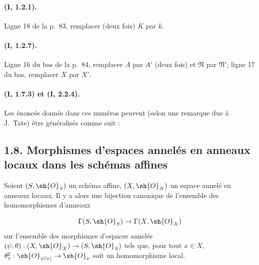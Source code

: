 \paragraph{(I, 1.2.1).}
Ligne 18 de la p.~83, remplacer (deux fois) $K$ par $k$.

\paragraph{(I, 1.2.7).}
Ligne 16 du bas de la p.~84, remplacer $A$ par $A'$ (deux fois) et
$\mathfrak N$ par $\mathfrak N'$; ligne 17 du bas, remplacer $X$ par
$X'$.

\paragraph{(I, 1.7.3) et (I, 2.2.4).}
Les énoncés donnés dans ces numéros peuvent (selon une remarque due à
J.~Tate) être généralisés comme suit :

\subsection*{1.8. Morphismes d'espaces annelés en anneaux locaux dans les schémas affines}
\label{ega2:addendum:subsection:I.1.8-fr}

\begin{proposition}[1.8.1]
\label{ega2:addendum:I.1.8.1-fr}
Soient $(S,\sh{O}_S)$ un schéma affine, $(X,\sh{O}_X)$ un espace annelé
en anneaux locaux. Il y a alors une bijection canonique de l'ensemble
des homomorphismes d'anneaux
\[
  \Gamma(S,\sh{O}_S)\to\Gamma(X,\sh{O}_X)
\]
sur l'ensemble des morphismes d'espaces annelés
$(\psi,\theta):(X,\sh{O}_X)\to(S,\sh{O}_S)$ tels que, pour tout
$x\in X$, $\theta_x^\sharp:\sh{O}_{\psi(x)}\to\sh{O}_x$ soit un
homomorphisme local.
\end{proposition}

